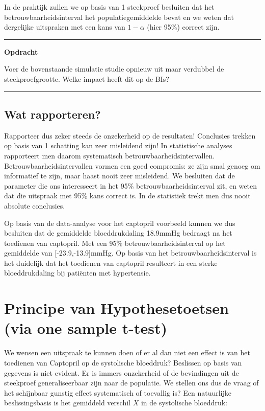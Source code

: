 \documentclass[
  12pt,dutch,coursenotes]{book}
\theoremstyle{definition}
\theoremstyle{definition}
\theoremstyle{definition}
\theoremstyle{definition}
\theoremstyle{remark}
\begin{document}
In de praktijk zullen we op basis van 1 steekproef besluiten dat het betrouwbaarheidsinterval het populatiegemiddelde bevat en we weten dat dergelijke uitspraken met een kans van \(1-\alpha\) (hier 95\%) correct zijn.

\begin{center}\rule{0.5\linewidth}{0.5pt}\end{center}

\textbf{Opdracht}

Voer de bovenstaande simulatie studie opnieuw uit maar verdubbel de steekproefgrootte. Welke impact heeft dit op de BIs?

\begin{center}\rule{0.5\linewidth}{0.5pt}\end{center}

\hypertarget{wat-rapporteren}{%
\subsection{Wat rapporteren?}\label{wat-rapporteren}}

Rapporteer dus zeker steeds de onzekerheid op de resultaten! Conclusies trekken op basis van 1 schatting kan zeer misleidend zijn! In statistische analyses rapporteert men daarom systematisch betrouwbaarheidsintervallen.
Betrouwbaarheidsintervallen vormen een goed compromis: ze zijn smal genoeg om informatief te zijn, maar haast nooit zeer misleidend. We besluiten dat de parameter die ons interesseert in het 95\% betrouwbaarheidsinterval zit,
en weten dat die uitspraak met 95\% kans correct is.
In de statistiek trekt men dus nooit absolute conclusies.

Op basis van de data-analyse voor het captopril voorbeeld kunnen we dus besluiten dat de gemiddelde bloeddrukdaling
18.9mmHg bedraagt na het toedienen van captopril. Met een 95\% betrouwbaarheidsinterval op het gemiddelde van {[}-23.9,-13.9{]}mmHg.
Op basis van het betrouwbaarheidsinterval is het duidelijk dat het toedienen van captopril resulteert in een sterke bloeddrukdaling bij patiënten met hypertensie.

\hypertarget{principe-van-hypothesetoetsen-via-one-sample-t-test}{%
\section{Principe van Hypothesetoetsen (via one sample t-test)}\label{principe-van-hypothesetoetsen-via-one-sample-t-test}}

We wensen een uitspraak te kunnen doen of er al dan niet een effect is van het toedienen van Captopril op de systolische bloeddruk? Beslissen op basis van gegevens is niet evident. Er is immers onzekerheid of de bevindingen uit de steekproef
generaliseerbaar zijn naar de populatie. We stellen ons dus de vraag of het schijnbaar gunstig effect systematisch of toevallig is?
Een natuurlijke beslissingsbasis is het gemiddeld verschil \(X\) in de systolische bloeddruk:
\end{document}
